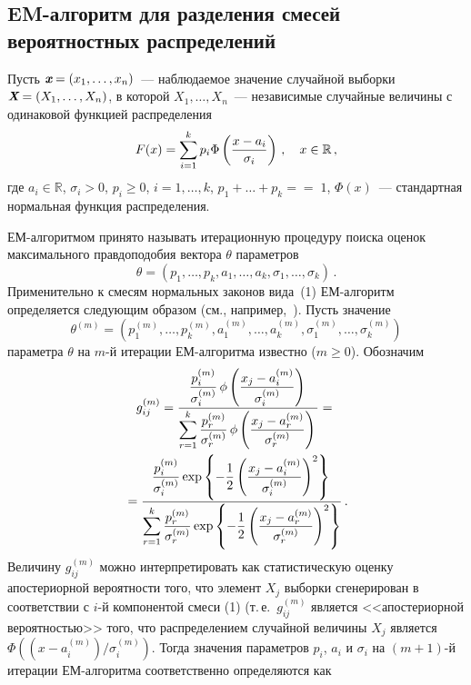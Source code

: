 \begin{multicols}{2}
\section{EM-алгоритм для разделения смесей вероятностных распределений}

Пусть $\emph{\textbf{x}}=(x_1,\ldots,x_n)$~--- наблюдаемое значение
случайной выборки $\emph{\textbf{X}}=(X_1,\ldots,X_n)$, в которой
$X_1,\ldots,X_n$~--- независимые случайные величины с одинаковой
функцией распределения
\begin{equation}
F(x)=\sum\limits_{i=1}^kp_i\Phi\left(\displaystyle\frac{\displaystyle x-a_i\mathstrut}{\displaystyle \sigma_i\mathstrut}\right)\,,\quad
x\in\mathbb{R}\,,
\end{equation}
где $a_i\in\mathbb{R}$,
$\sigma_i>0$, $p_i\ge0$, $i=1,\ldots,k$, $p_1+\ldots+p_k=$\linebreak $=\;1$,
$\Phi(x)$~--- стандартная нормальная функция рас\-пре\-де\-ле\-ния.


ЕМ-алгоритмом принято называть итерационную процедуру поиска
оценок максимального правдоподобия вектора $\theta$ параметров
$$
\theta=(p_1,\ldots,p_k,a_1,\ldots,a_k,\sigma_1,\ldots,\sigma_k)\,.
$$
Применительно к смесям нормальных законов вида~(1) ЕМ-алгоритм
определяется следующим образом (см., например,~\cite{Korolev2007b}). Пусть значение
$$
\theta^{(m)}\!=\!\left ( p_1^{(m)},\ldots,p_k^{(m)},a_1^{(m)},\ldots,a_k^{(m)},\sigma_1^{(m)},\ldots,\sigma_k^{(m)}\!\right )
$$
параметра $\theta$ на $m$-й итерации ЕМ-алгоритма известно
($m\ge0$). Обозначим
\begin{multline*}
g_{ij}^{(m)}=\displaystyle\frac{\displaystyle \displaystyle\frac{\displaystyle p_i^{(m)}\mathstrut}{\displaystyle \sigma_i^{(m)}\mathstrut}\,\phi\left(\displaystyle\frac{\displaystyle x_j-a_i^{(m)}\mathstrut}{\displaystyle \sigma_i^{(m)}\mathstrut}\right)\mathstrut}{\displaystyle \sum\limits_{r=1}^k\displaystyle\frac{\displaystyle p_r^{(m)}\mathstrut}{\displaystyle \sigma_r^{(m)}\mathstrut}\,\phi\left(\displaystyle\frac{\displaystyle x_j-a_r^{(m)}\mathstrut}{\displaystyle \sigma_r^{(m)}\mathstrut}\right)\mathstrut}={}\\
{}=
\displaystyle\frac{\displaystyle \displaystyle\frac{\displaystyle p_i^{(m)}\mathstrut}{\displaystyle \sigma_i^{(m)}\mathstrut}\exp\left\{-\displaystyle\frac{\displaystyle 1\mathstrut}{\displaystyle 2\mathstrut}\left(\displaystyle\frac{\displaystyle x_j-a_i^{(m)}\mathstrut}{\displaystyle \sigma_i^{(m)}\mathstrut}\right)^2\right\}\mathstrut}{\displaystyle \sum\limits_{r=1}^k{\displaystyle{\displaystyle\frac{\displaystyle p_r^{(m)}\mathstrut}{\displaystyle \sigma_r^{(m)}\mathstrut}\exp\left\{-\displaystyle\frac{\displaystyle 1\mathstrut}{\displaystyle 2\mathstrut}\left(
\displaystyle\frac{\displaystyle x_j-a_r^{(m)}\mathstrut}{\displaystyle \sigma_r^{(m)}\mathstrut}\right)^2\right\}}}\mathstrut}\,.
\end{multline*}
Величину $g_{ij}^{(m)}$ можно интерпретировать как статистическую
оценку апостериорной вероятности того, что элемент $X_j$ выборки
сгенерирован в соответствии с $i$-й компонентой смеси (1) (т.\,е.\
$g_{ij}^{(m)}$ является <<апостериорной вероятностью>> того, что
распределением случайной величины $X_j$ является
$\Phi\left(\left(x-a_i^{(m)}\right)\bigg /\sigma_i^{(m)}\right)$. Тогда значения
параметров $p_i$, $a_i$ и $\sigma_i$ на $(m+1)$-й итерации
ЕМ-алгоритма соответственно определяются как


\end{multicols}
